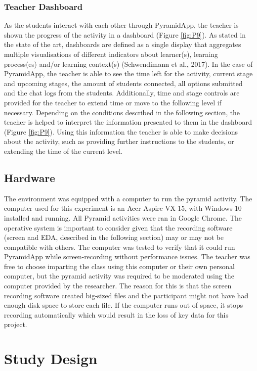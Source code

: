 \subsubsection{Teacher Dashboard}
As the students interact with each other through PyramidApp, the teacher is shown the progress of the activity in a dashboard (Figure \ref{fig:P9}). As stated in the state of the art, dashboards are defined as a single display that aggregates multiple visualisations of different indicators about learner(s), learning process(es) and/or learning context(s) (Schwendimann et al., 2017). In the case of PyramidApp, the teacher is able to see the time left for the activity, current stage and upcoming stages, the amount of students connected, all options submitted and the chat logs from the students. Additionally, time and stage controls are provided for the teacher to extend time or move to the following level if necessary. Depending on the conditions described in the following section, the teacher is helped to interpret the information presented to them in the dashboard (Figure \ref{fig:P9}). Using this information the teacher is able to make decisions about the activity, such as providing further instructions to the students, or extending the time of the current level.

\subsection{Hardware}
The environment was equipped with a computer to run the pyramid activity. The computer used for this experiment is an Acer Aspire VX 15, with Windows 10 installed and running. All Pyramid activities were ran in Google Chrome. The operative system is important to consider given that the recording software (screen and EDA, described in the following section) may or may not be compatible with others. The computer was tested to verify that it could run PyramidApp while screen-recording without performance issues. 
The teacher was free to choose imparting the class using this computer or their own personal computer, but the pyramid activity was required to be moderated using the computer provided by the researcher. The reason for this is that the screen recording software created big-sized files and the participant might not have had enough disk space to store each file. If the computer runs out of space, it stops recording automatically which would result in the loss of key data for this project.
\section{Study Design}
